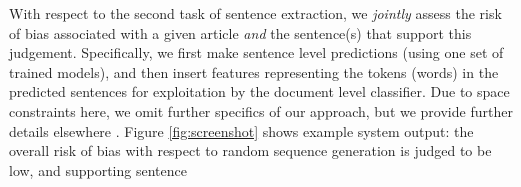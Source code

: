 \documentclass[runningheads,a4paper]{llncs}
\begin{document}
With respect to the second task of sentence extraction, we \emph{jointly} assess the risk of bias associated with a given article \emph{and} the sentence(s) that support this judgement. 
Specifically, we first make sentence level predictions (using one set of trained models), and then insert features representing the tokens (words) in the predicted sentences for exploitation by the document level classifier.
Due to space constraints here, we omit further specifics of our approach, but we provide further details elsewhere \cite{marshall2014}. 
Figure \ref{fig:screenshot} shows example system output: the overall risk of bias with respect to random sequence generation is judged to be low, and supporting sentence



\end{document}
